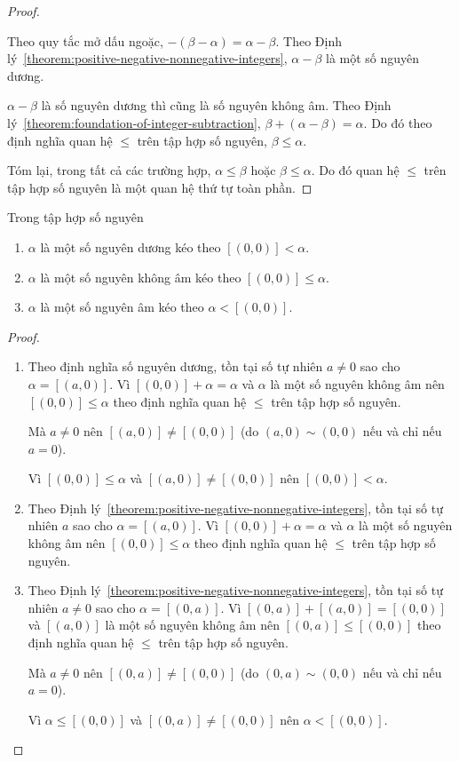 \begin{proof}
\begin{enumerate}[label={\textbf{Trường hợp \arabic*.}},itemindent=2cm]
		      Theo quy tắc mở dấu ngoặc, $-(\beta - \alpha) = \alpha - \beta$. Theo Định lý~\ref{theorem:positive-negative-nonnegative-integers}, $\alpha - \beta$ là một số nguyên dương.

		      $\alpha - \beta$ là số nguyên dương thì cũng là số nguyên không âm. Theo Định lý~\ref{theorem:foundation-of-integer-subtraction}, $\beta + (\alpha - \beta) = \alpha$. Do đó theo định nghĩa quan hệ $\leq$ trên tập hợp số nguyên, $\beta\leq\alpha$.
	\end{enumerate}

	Tóm lại, trong tất cả các trường hợp, $\alpha\leq\beta$ hoặc $\beta\leq\alpha$. Do đó quan hệ $\leq$ trên tập hợp số nguyên là một quan hệ thứ tự toàn phần.
\end{proof}

\begin{theorem}
	Trong tập hợp số nguyên
	\begin{enumerate}[label={(\roman*)}]
		\item $\alpha$ là một số nguyên dương kéo theo $[(0,0)] < \alpha$.
		\item $\alpha$ là một số nguyên không âm kéo theo $[(0,0)] \leq \alpha$.
		\item $\alpha$ là một số nguyên âm kéo theo $\alpha < [(0,0)]$.
	\end{enumerate}
\end{theorem}

\begin{proof}
	\begin{enumerate}[label={(\roman*)}]
		\item Theo định nghĩa số nguyên dương, tồn tại số tự nhiên $a\ne 0$ sao cho $\alpha = [(a, 0)]$. Vì $[(0,0)] + \alpha = \alpha$ và $\alpha$ là một số nguyên không âm nên $[(0,0)]\leq \alpha$ theo định nghĩa quan hệ $\leq$ trên tập hợp số nguyên.

		      Mà $a\ne 0$ nên $[(a, 0)]\ne [(0, 0)]$ (do $(a, 0)\sim (0, 0)$ nếu và chỉ nếu $a = 0$).

		      Vì $[(0,0)]\leq\alpha$ và $[(a, 0)]\ne [(0,0)]$ nên $[(0,0)] < \alpha$.
		\item Theo Định lý~\ref{theorem:positive-negative-nonnegative-integers}, tồn tại số tự nhiên $a$ sao cho $\alpha = [(a, 0)]$. Vì $[(0,0)] + \alpha = \alpha$ và $\alpha$ là một số nguyên không âm nên $[(0,0)]\leq \alpha$ theo định nghĩa quan hệ $\leq$ trên tập hợp số nguyên.
		\item Theo Định lý~\ref{theorem:positive-negative-nonnegative-integers}, tồn tại số tự nhiên $a\ne 0$ sao cho $\alpha = [(0, a)]$. Vì $[(0,a)] + [(a,0)] = [(0,0)]$ và $[(a, 0)]$ là một số nguyên không âm nên $[(0,a)]\leq [(0,0)]$ theo định nghĩa quan hệ $\leq$ trên tập hợp số nguyên.

		      Mà $a\ne 0$ nên $[(0, a)]\ne [(0, 0)]$ (do $(0, a)\sim (0, 0)$ nếu và chỉ nếu $a = 0$).

		      Vì $\alpha\leq[(0,0)]$ và $[(0, a)]\ne [(0,0)]$ nên $\alpha < [(0,0)]$.
	\end{enumerate}
\end{proof}

